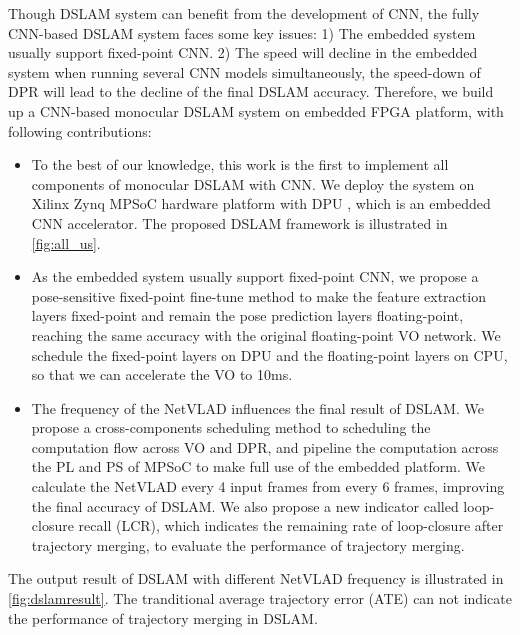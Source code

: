 Though DSLAM system can benefit from the development of CNN, the fully CNN-based DSLAM system faces some key issues: 1) The embedded system usually support fixed-point CNN. 2) The speed will decline in the embedded system when running several CNN models simultaneously, the speed-down of DPR will lead to the decline of the final DSLAM accuracy. Therefore, we build up a CNN-based monocular DSLAM system on embedded FPGA platform, with following contributions:

\begin{itemize}
\item To the best of our knowledge, this work is the first to implement all components of monocular DSLAM with CNN.
We deploy the system on Xilinx Zynq MPSoC hardware platform with DPU \cite{Tech:2019360}, which is an embedded CNN accelerator. The proposed DSLAM framework is illustrated in \cref{fig:all_us}.
\item As the embedded system usually support fixed-point CNN, we propose a pose-sensitive fixed-point fine-tune method to make the feature extraction layers fixed-point and remain the pose prediction layers floating-point, reaching the same accuracy with the original floating-point VO network. We schedule the fixed-point layers on DPU and the floating-point layers on CPU, so that we can accelerate the VO to 10ms.
\item The frequency of the NetVLAD influences the final result of DSLAM. We propose a cross-components scheduling method to scheduling the computation flow across VO and DPR, and pipeline the computation across the PL and PS of MPSoC to make full use of the embedded platform. We calculate the NetVLAD every 4 input frames from every 6 frames, improving the final accuracy of DSLAM. 
We also propose a new indicator called loop-closure recall (LCR), which indicates the remaining rate of loop-closure after trajectory merging, to evaluate the performance of trajectory merging.
\end{itemize}

The output result of DSLAM with different NetVLAD frequency is illustrated in \cref{fig:dslamresult}. The tranditional average trajectory error (ATE) can not indicate the performance of trajectory merging in DSLAM. 

